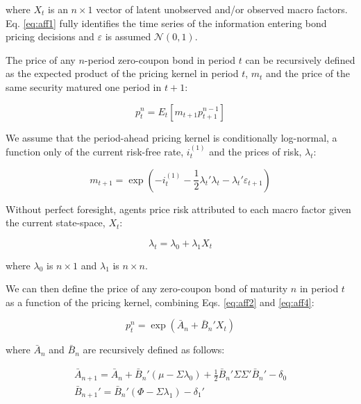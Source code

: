 \documentclass{article}
\numberwithin{equation}{section}
\begin{document}
where $X_t$ is an $n\times1$ vector of latent unobserved and/or observed macro
factors. Eq. \ref{eq:aff1} fully identifies the time series of the information
entering bond pricing decisions and $\varepsilon$ is assumed
$\mathcal{N}(0,1)$.

The price of any $n$-period zero-coupon bond in period $t$ can be recursively
defined as the expected product of the pricing kernel in period $t$, $m_t$ and
the price of the same security matured one period in $t+1$:

\begin{equation}
    p_t^n=E_t[m_{t+1}p_{t+1}^{n-1}]
    \label{eq:aff2}
\end{equation}

We assume that the period-ahead pricing kernel is conditionally log-normal,
a function only of the current risk-free rate, $i_t^{(1)}$ and the prices of
risk, $\lambda_t$:

\begin{equation}
    m_{t+1}=\exp{(-i_t^{(1)}-\frac{1}{2}\lambda_t'\lambda_t-\lambda_t'\varepsilon_{t+1})}
    \label{eq:aff3}
\end{equation}

Without perfect foresight, agents price risk attributed to each macro factor
given the current state-space, $X_t$:

\begin{equation}
    \lambda_t = \lambda_0 + \lambda_1X_t
    \label{eq:aff4}
\end{equation}

where $\lambda_0$ is $n\times1$ and $\lambda_1$ is $n\times{n}$.

We can then define the price of any zero-coupon bond of maturity $n$ in period
$t$ as a function of the pricing kernel, combining Eqs. \ref{eq:aff2} and
\ref{eq:aff4}:

\begin{equation}
    p_t^n=\exp{(\bar{A}_n+\bar{B}_n'X_t)}
    \label{eq:aff5}
\end{equation}

where $\bar{A}_n$ and $\bar{B}_n$ are recursively defined as follows:

\begin{eqnarray}
    \bar{A}_{n+1}=\bar{A}_{n}+\bar{B}_n'(\mu-\Sigma\lambda_0)+\frac{1}{2}\bar{B}_n'\Sigma\Sigma'\bar{B}_n'-\delta_0  \nonumber \\
    \bar{B}_{n+1}'=\bar{B}_n'(\Phi-\Sigma\lambda_1)-\delta_1'
    \label{eq:aff6}
\end{eqnarray}
\end{document}
